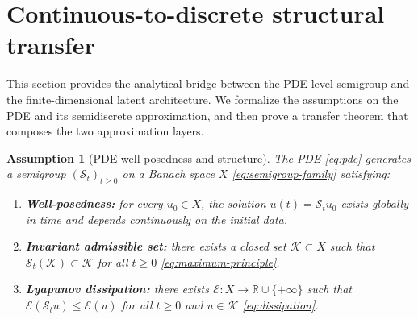 \documentclass[11pt]{article}
\newtheorem{assumption}{Assumption}
\newcommand{\R}{\mathbb{R}}
\newcommand{\cS}{\mathcal{S}}
\newcommand{\cK}{\mathcal{K}}
\newcommand{\cE}{\mathcal{E}}
\begin{document}
\section{Continuous-to-discrete structural transfer}\label{sec:transfer}

This section provides the analytical bridge between the PDE-level semigroup and the finite-dimensional latent architecture. We formalize the assumptions on the PDE and its semidiscrete approximation, and then prove a transfer theorem that composes the two approximation layers.

\begin{assumption}[PDE well-posedness and structure]\label{ass:pde-structure}
The PDE \eqref{eq:pde} generates a semigroup $(\cS_t)_{t\ge 0}$ on a Banach space $X$ \eqref{eq:semigroup-family} satisfying:
\begin{enumerate}[label=(\roman*)]
    \item \textbf{Well-posedness:} for every $u_0\in X$, the solution $u(t)=\cS_tu_0$ exists globally in time and depends continuously on the initial data.
    \item \textbf{Invariant admissible set:} there exists a closed set $\cK\subset X$ such that $\cS_t(\cK)\subset \cK$ for all $t\ge 0$ \eqref{eq:maximum-principle}.
    \item \textbf{Lyapunov dissipation:} there exists $\cE:X\to \R\cup\{+\infty\}$ such that $\cE(\cS_tu)\le \cE(u)$ for all $t\ge 0$ and $u\in \cK$ \eqref{eq:dissipation}.
\end{enumerate}
\end{assumption}
\end{document}
